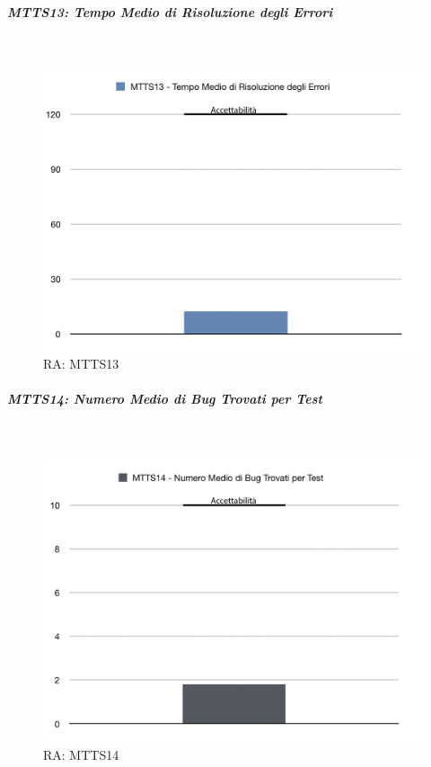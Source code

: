\subparagraph{MTTS13: Tempo Medio di Risoluzione degli Errori} \-\\

\begin{figure}[H]
	\begin{center}
		\includegraphics[scale=0.5]{./images/grafici_RA/PR05_temprisoluzioneerrori.png} 
		\caption{RA: MTTS13}
	\end{center}
\end{figure}

\subparagraph{MTTS14: Numero Medio di Bug Trovati per Test} \-\\

\begin{figure}[H]
	\begin{center}
		\includegraphics[scale=0.5]{./images/grafici_RA/PR05errorimedi.png} 
		\caption{RA: MTTS14}
	\end{center}
\end{figure}

